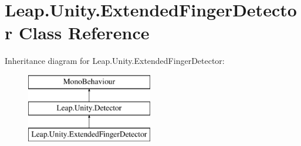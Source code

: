 \hypertarget{class_leap_1_1_unity_1_1_extended_finger_detector}{}\section{Leap.\+Unity.\+Extended\+Finger\+Detector Class Reference}
\label{class_leap_1_1_unity_1_1_extended_finger_detector}
Inheritance diagram for Leap.\+Unity.\+Extended\+Finger\+Detector\+:\begin{figure}[H]
\begin{center}
\leavevmode
\includegraphics[height=3.000000cm]{class_leap_1_1_unity_1_1_extended_finger_detector}
\end{center}
\end{figure}
